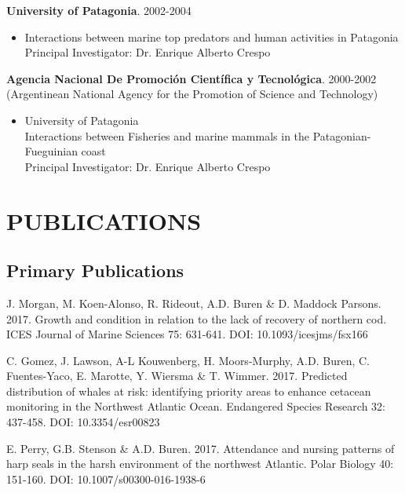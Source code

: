 \documentclass{res}
\begin{document}
\begin{resume}
\textbf{University of Patagonia}. 2002-2004
\begin{itemize} %
	\item[] Interactions between marine top predators and human activities in Patagonia\\
Principal Investigator: Dr. Enrique Alberto Crespo
\end{itemize}



\textbf{Agencia Nacional De Promoci\'{o}n Cient\'{i}fica y Tecnol\'{o}gica}. 2000-2002\\
(Argentinean National Agency for the Promotion of Science and Technology)
\begin{itemize} %
	\item[] University of Patagonia\\
Interactions between Fisheries and marine mammals in the Patagonian-Fueguinian coast\\
Principal Investigator: Dr. Enrique Alberto Crespo
\end{itemize}


\section{PUBLICATIONS} 
\subsection{Primary Publications}
\begin{hangparas}{.4in}{1}

J. Morgan, M. Koen-Alonso, R. Rideout, A.D. Buren \& D. Maddock Parsons. 2017. Growth and condition in relation to the lack of recovery of northern cod. ICES Journal of Marine Sciences 75: 631-641. DOI: 10.1093/icesjms/fsx166

C. Gomez,  J. Lawson, A-L Kouwenberg, H. Moors-Murphy, A.D. Buren, C. Fuentes-Yaco, E.  Marotte, Y. Wiersma \& T. Wimmer. 2017. Predicted distribution of whales at risk: identifying priority areas to enhance cetacean monitoring in the Northwest Atlantic Ocean. Endangered Species Research 32: 437-458. DOI: 10.3354/esr00823

E. Perry, G.B. Stenson \& A.D. Buren. 2017. Attendance and nursing patterns of harp seals in the harsh environment of the northwest Atlantic. Polar Biology 40: 151-160. DOI: 10.1007/s00300-016-1938-6


\end{hangparas}
\end{resume}
\end{document}
